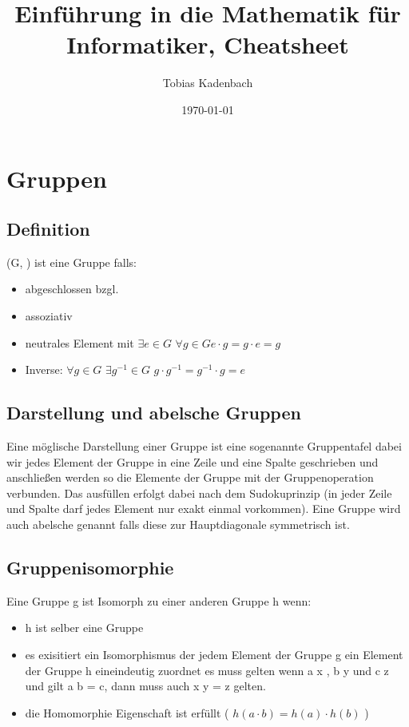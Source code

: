 \documentclass[12pt, letterpaper, twoside]{article}
\title{Einführung in die Mathematik für Informatiker, Cheatsheet}
\author{Tobias Kadenbach}
\date{\today}
\begin{document}
\maketitle

\tableofcontents 

\section{Gruppen}
\subsection{Definition}
(G, \cdot) ist eine Gruppe falls:
\begin{itemize}
	\item abgeschlossen bzgl. \cdot
	\item assoziativ
	\item neutrales Element mit $ \exists e \in G $ $\forall g \in G e \cdot g = g \cdot e = g $
	\item Inverse: $ \forall g \in G $  $\exists g^{-1}  \in G $ $g \cdot g^{-1} = g^{-1} \cdot g = e $
\end{itemize}
\subsection{Darstellung und abelsche Gruppen}
\noindent
Eine möglische Darstellung einer Gruppe ist eine sogenannte Gruppentafel dabei wir jedes Element der Gruppe in eine Zeile und eine Spalte geschrieben und anschließen werden so die Elemente der Gruppe mit der Gruppenoperation verbunden. Das ausfüllen erfolgt dabei nach dem Sudokuprinzip (in jeder Zeile und Spalte darf jedes Element nur exakt einmal vorkommen).  
Eine Gruppe wird auch abelsche genannt falls diese zur Hauptdiagonale symmetrisch ist. \\

\subsection{Gruppenisomorphie}
\noindent
Eine Gruppe g ist Isomorph zu einer anderen Gruppe h wenn:
\begin{itemize}
	\item h ist selber eine Gruppe
	\item es exisitiert ein Isomorphismus der jedem Element der Gruppe g ein Element der Gruppe h eineindeutig zuordnet es muss gelten wenn a \mapsto x , b \mapsto y und c \mapsto z und gilt a \cdot b = c, dann muss auch x \cdot y = z gelten.
	\item die Homomorphie Eigenschaft ist erfüllt ( $ h(a \cdot b) = h(a) \cdot h(b) $ )
\end{itemize}
\end{document}
